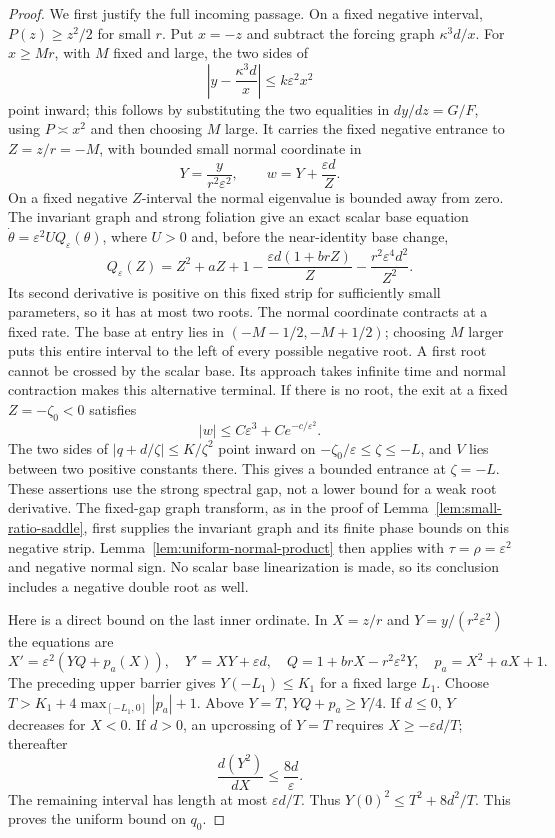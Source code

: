 \begin{proof}
We first justify the full incoming passage. On a fixed negative interval,
$P(z)\ge z^2/2$ for small $r$. Put $x=-z$ and subtract the forcing
graph $\kappa^3d/x$. For $x\ge Mr$, with $M$ fixed and large, the
two sides of
\[
 \left|y-\frac{\kappa^3d}{x}\right|
       \le k\varepsilon^2x^2
\]
point inward; this follows by substituting the two equalities in
$dy/dz=G/F$, using $P\asymp x^2$ and then choosing $M$ large.
It carries the fixed negative entrance to $Z=z/r=-M$, with bounded
small normal coordinate in
\[
 Y=\frac{y}{r^2\varepsilon^2},\qquad
 w=Y+\frac{\varepsilon d}{Z}.
\]
On a fixed negative $Z$-interval the normal eigenvalue is bounded away
from zero. The invariant graph and strong foliation give an exact
scalar base equation $\dot\theta=\varepsilon^2UQ_\varepsilon(\theta)$,
where $U>0$ and, before the near-identity base change,
\[
 Q_\varepsilon(Z)=Z^2+aZ+1-\frac{\varepsilon d(1+brZ)}Z
                         -\frac{r^2\varepsilon^4d^2}{Z^2}.
\]
Its second derivative is positive on this fixed strip for sufficiently
small parameters, so it has at most two roots. The normal coordinate
contracts at a fixed rate.
The base at entry lies in $(-M-1/2,-M+1/2)$; choosing $M$ larger puts
this entire interval to the left of every possible negative root.
A first root cannot be crossed by the scalar base. Its approach takes
infinite time and normal contraction makes this alternative terminal.
If there is no root, the exit at a fixed $Z=-\zeta_0<0$ satisfies
\[
 |w|\le C\varepsilon^3+C e^{-c/\varepsilon^2}.
\]
The two sides of $|q+d/\zeta|\le K/\zeta^2$ point inward on
$-\zeta_0/\varepsilon\le\zeta\le-L$, and $V$ lies between two
positive constants there. This gives a bounded entrance at $\zeta=-L$.
These assertions use the strong spectral gap, not a lower bound for a
weak root derivative. The fixed-gap graph transform, as in the proof
of Lemma~\ref{lem:small-ratio-saddle}, first supplies the invariant
graph and its finite phase bounds on this negative strip.
Lemma~\ref{lem:uniform-normal-product} then applies with
$\tau=\rho=\varepsilon^2$ and negative normal sign. No scalar base
linearization is made, so its conclusion includes a negative double
root as well.

Here is a direct bound on the last inner ordinate. In $X=z/r$ and
$Y=y/(r^2\varepsilon^2)$ the equations are
\[
 X'=\varepsilon^2(YQ+p_a(X)),\quad
 Y'=XY+\varepsilon d,\quad
 Q=1+brX-r^2\varepsilon^2Y,\quad p_a=X^2+aX+1.
\]
The preceding upper barrier gives $Y(-L_1)\le K_1$ for a fixed large
$L_1$. Choose $T>K_1+4\max_{[-L_1,0]}|p_a|+1$. Above $Y=T$,
$YQ+p_a\ge Y/4$. If $d\le0$, $Y$ decreases for $X<0$. If $d>0$,
an upcrossing of $Y=T$ requires $X\ge-\varepsilon d/T$; thereafter
\[
 \frac{d(Y^2)}{dX}\le\frac{8d}{\varepsilon}.
\]
The remaining interval has length at most $\varepsilon d/T$.
Thus $Y(0)^2\le T^2+8d^2/T$. This proves the uniform bound on $q_0$.


\end{proof}
